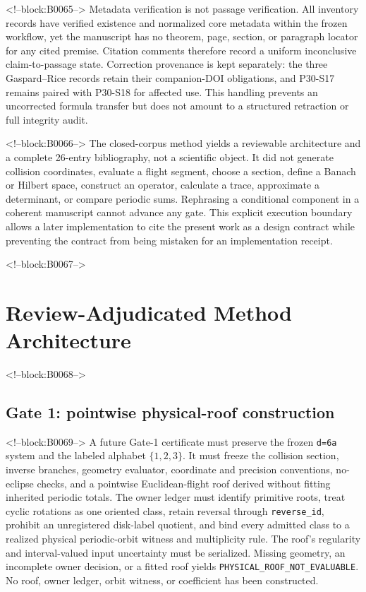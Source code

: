 \documentclass[11pt,a4paper]{article}
\begin{document}
<!--block:B0065-->
Metadata verification is not passage verification. All inventory records have verified existence and normalized core metadata within the frozen workflow, yet the manuscript has no theorem, page, section, or paragraph locator for any cited premise. Citation comments therefore record a uniform inconclusive claim-to-passage state. Correction provenance is kept separately: the three Gaspard--Rice records retain their companion-DOI obligations, and P30-S17 remains paired with P30-S18 for affected use. This handling prevents an uncorrected formula transfer but does not amount to a structured retraction or full integrity audit.

<!--block:B0066-->
The closed-corpus method yields a reviewable architecture and a complete 26-entry bibliography, not a scientific object. It did not generate collision coordinates, evaluate a flight segment, choose a section, define a Banach or Hilbert space, construct an operator, calculate a trace, approximate a determinant, or compare periodic sums. Rephrasing a conditional component in a coherent manuscript cannot advance any gate. This explicit execution boundary allows a later implementation to cite the present work as a design contract while preventing the contract from being mistaken for an implementation receipt.

<!--block:B0067-->
\section{Review-Adjudicated Method Architecture}

<!--block:B0068-->
\subsection{Gate 1: pointwise physical-roof construction}

<!--block:B0069-->
A future Gate-1 certificate must preserve the frozen \texttt{d=6a} system and the labeled alphabet \(\{1,2,3\}\). It must freeze the collision section, inverse branches, geometry evaluator, coordinate and precision conventions, no-eclipse checks, and a pointwise Euclidean-flight roof derived without fitting inherited periodic totals. The owner ledger must identify primitive roots, treat cyclic rotations as one oriented class, retain reversal through \texttt{reverse\_id}, prohibit an unregistered disk-label quotient, and bind every admitted class to a realized physical periodic-orbit witness and multiplicity rule. The roof's regularity and interval-valued input uncertainty must be serialized. Missing geometry, an incomplete owner decision, or a fitted roof yields \texttt{PHYSICAL\_ROOF\_NOT\_EVALUABLE}. No roof, owner ledger, orbit witness, or coefficient has been constructed.
\end{document}
